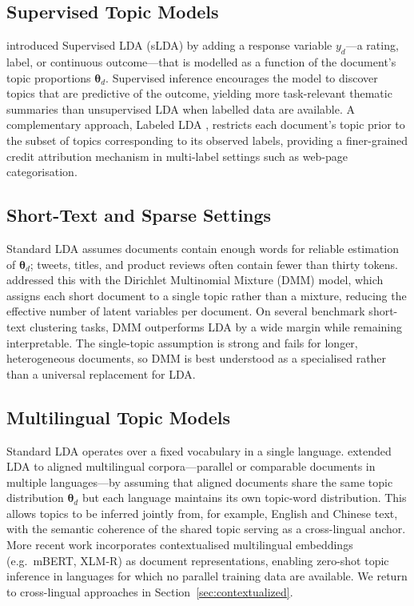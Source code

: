 \documentclass[11pt,a4paper]{article}
\newcommand{\vect}[1]{\boldsymbol{#1}}
\begin{document}
\subsection{Supervised Topic Models}
\label{sec:slda}

\textcite{blei2007supervised} introduced Supervised LDA (sLDA) by
adding a response variable $y_{d}$---a rating, label, or continuous
outcome---that is modelled as a function of the document's topic
proportions $\vect{\theta}_{d}$.
Supervised inference encourages the model to discover topics that are
predictive of the outcome, yielding more task-relevant thematic
summaries than unsupervised LDA when labelled data are available.
A complementary approach, Labeled LDA \parencite{ramage2009labeled},
restricts each document's topic prior to the subset of topics
corresponding to its observed labels, providing a finer-grained credit
attribution mechanism in multi-label settings such as web-page
categorisation.

\subsection{Short-Text and Sparse Settings}
\label{sec:shorttext}

Standard LDA assumes documents contain enough words for reliable
estimation of $\vect{\theta}_{d}$; tweets, titles, and product reviews
often contain fewer than thirty tokens.
\textcite{yin2014dirichlet} addressed this with the Dirichlet
Multinomial Mixture (DMM) model, which assigns each short document to
a single topic rather than a mixture, reducing the effective number of
latent variables per document.
On several benchmark short-text clustering tasks, DMM outperforms LDA
by a wide margin while remaining interpretable.
The single-topic assumption is strong and fails for longer, heterogeneous
documents, so DMM is best understood as a specialised rather than a
universal replacement for LDA.

\subsection{Multilingual Topic Models}
\label{sec:multilingual}

Standard LDA operates over a fixed vocabulary in a single language.
\textcite{mimno2009polylingual} extended LDA to aligned multilingual
corpora---parallel or comparable documents in multiple languages---by
assuming that aligned documents share the same topic distribution
$\vect{\theta}_{d}$ but each language maintains its own topic-word
distribution.
This allows topics to be inferred jointly from, for example, English
and Chinese text, with the semantic coherence of the shared topic
serving as a cross-lingual anchor.
More recent work \parencite{bianchi2021crosslingual} incorporates
contextualised multilingual embeddings (e.g.\ mBERT, XLM-R) as
document representations, enabling zero-shot topic inference in
languages for which no parallel training data are available.
We return to cross-lingual approaches in Section~\ref{sec:contextualized}.
\end{document}

